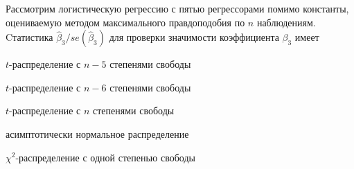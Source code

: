 
\begin{question}
Рассмотрим логистическую регрессию с пятью регрессорами помимо константы, оцениваемую
методом максимального правдоподобия по \(n\) наблюдениям.
Cтатистика \(\hat \beta_3 / se(\hat\beta_3)\) для проверки значимости коэффициента \(\beta_3\) имеет
\begin{answerlist}
  \item \(t\)-распределение с \(n-5\) степенями свободы
  \item \(t\)-распределение с \(n-6\) степенями свободы
  \item \(t\)-распределение с \(n\) степенями свободы
  \item асимптотически нормальное распределение
  \item \(\chi^2\)-распределение с одной степенью свободы
\end{answerlist}
\end{question}


